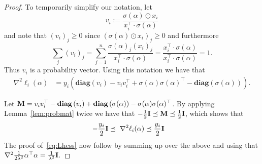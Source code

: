 \documentclass[11pt]{article}
\newcommand{\diag}[1]{\mathbf{diag}\left( #1\right)}
\newcommand{\mI}{{\bf I}}
\newcommand{\mM}{{\bf M}}
\begin{document}
\begin{proof}
To temporarily simplify our notation, let
\[v_i := \frac{\sigma(\alpha) \odot x_i}{x_i^{\top} \cdot \sigma(\alpha)}\]
and note that $(v_i)_j \geq 0$ since $(\sigma(\alpha) \odot x_i)_j \geq 0$ and furthermore 
\[\sum_{j} (v_i)_j = \sum_{j=1}^n \frac{\sigma(\alpha)_j (x_i)_j}{x_i^{\top} \cdot \sigma(\alpha)} =\frac{x_i^{\top} \cdot \sigma(\alpha)}{x_i^{\top} \cdot \sigma(\alpha)} =1. \]
Thus $v_i$ is a probability vector. Using this notation we have that
\begin{align}
\nabla^2 \ell_i(\alpha)& = y_i \left( \diag{v_i} - v_iv_i^\top +\sigma(\alpha)\sigma(\alpha)^\top - \diag{\sigma(\alpha)} \right). \label{eq:tempsoinjz4}
\end{align}

Let  $\mM = v_iv_i^\top -\diag{v_i} +\diag{\sigma(\alpha)} -\sigma(\alpha)\sigma(\alpha)^\top$. By applying Lemma~\ref{lem:probmat} twice we have that $- \frac{1}{2}\mI \preceq \mM \preceq \frac{1}{2}\mI$, which shows that
\begin{align}
-\frac{y_i}{2}\mI \preceq \; \nabla^2 \ell_i(\alpha)& \preceq  \frac{y_i}{2}\mI
\end{align}
The proof of~\eqref{eq:Lhess} now follow by summing up over the above and using that $\nabla^2 \frac{1}{2 \lambda^2}\alpha^\top \alpha = \frac{1}{\lambda^2} \mI.$
\end{proof}


\end{document}
